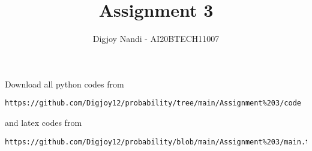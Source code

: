 \documentclass[journal,12pt,twocolumn]{IEEEtran}
\DeclareMathOperator*{\Res}{Res}
\begin{document}
\newcommand{\BEQA}{\begin{eqnarray}}
\newcommand{\EEQA}{\end{eqnarray}}
\newcommand{\define}{\stackrel{\triangle}{=}}

\raggedbottom
\setlength{\parindent}{0pt}
\providecommand{\mbf}{\mathbf}
\providecommand{\pr}[1]{\ensuremath{\Pr\left(#1\right)}}
\providecommand{\qfunc}[1]{\ensuremath{Q\left(#1\right)}}
\providecommand{\sbrak}[1]{\ensuremath{{}\left[#1\right]}}
\providecommand{\lsbrak}[1]{\ensuremath{{}\left[#1\right.}}
\providecommand{\rsbrak}[1]{\ensuremath{{}\left.#1\right]}}
\providecommand{\brak}[1]{\ensuremath{\left(#1\right)}}
\providecommand{\lbrak}[1]{\ensuremath{\left(#1\right.}}
\providecommand{\rbrak}[1]{\ensuremath{\left.#1\right)}}
\providecommand{\cbrak}[1]{\ensuremath{\left\{#1\right\}}}
\providecommand{\lcbrak}[1]{\ensuremath{\left\{#1\right.}}
\providecommand{\rcbrak}[1]{\ensuremath{\left.#1\right\}}}
\theoremstyle{remark}
\newtheorem{rem}{Remark}
\newcommand{\sgn}{\mathop{\mathrm{sgn}}}
\providecommand{\abs}[1]{\vert#1\vert}
\providecommand{\res}[1]{\Res\displaylimits_{#1}} 
\providecommand{\norm}[1]{\lVert#1\rVert}
\providecommand{\mtx}[1]{\mathbf{#1}}
\providecommand{\mean}[1]{E[ #1 ]}
\providecommand{\fourier}{\overset{\mathcal{F}}{ \rightleftharpoons}}
\providecommand{\system}{\overset{\mathcal{H}}{ \longleftrightarrow}}
\newcommand{\solution}{\noindent \textbf{Solution: }}
\newcommand{\cosec}{\,\text{cosec}\,}
\providecommand{\dec}[2]{\ensuremath{\overset{#1}{\underset{#2}{\gtrless}}}}
\newcommand{\myvec}[1]{\ensuremath{\begin{pmatrix}#1\end{pmatrix}}}
\newcommand{\mydet}[1]{\ensuremath{\begin{vmatrix}#1\end{vmatrix}}}
\makeatletter
{}
\makeatother
\let\StandardTheFigure\thefigure
\let\vec\mathbf
\renewcommand{\thefigure}{\theproblem}
\def\putbox#1#2#3{\makebox[0in][l]{\makebox[#1][l]{}\raisebox{\baselineskip}[0in][0in]{\raisebox{#2}[0in][0in]{#3}}}}
     \def\rightbox#1{\makebox[0in][r]{#1}}
     \def\centbox#1{\makebox[0in]{#1}}
     \def\topbox#1{\raisebox{-\baselineskip}[0in][0in]{#1}}
     \def\midbox#1{\raisebox{-0.5\baselineskip}[0in][0in]{#1}}
\vspace{3cm}
\title{Assignment 3}
\author{Digjoy Nandi - AI20BTECH11007}
\maketitle
\newpage
\bigskip
\renewcommand{\thefigure}{\theenumi}
\renewcommand{\thetable}{\theenumi}
Download all python codes from 
\begin{lstlisting}
https://github.com/Digjoy12/probability/tree/main/Assignment%203/code
\end{lstlisting}
%
and latex codes from 
%
\begin{lstlisting}
https://github.com/Digjoy12/probability/blob/main/Assignment%203/main.tex
\end{lstlisting}
\end{document}
